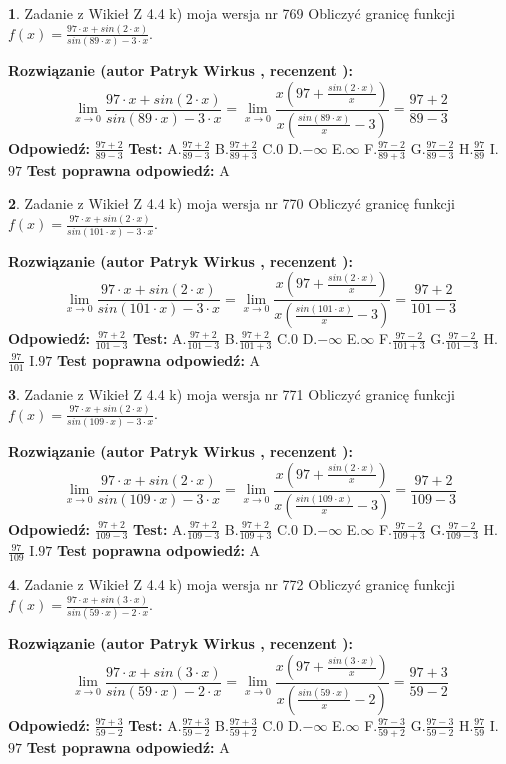 \documentclass[12pt, a4paper]{article}
\theoremstyle{definition} %
\newtheorem{zad}{}
\newcommand{\zadStart}[1]{\begin{zad}#1\newline}
\newcommand{\zadStop}{\end{zad}}
\newcommand{\rozwStart}[2]{\noindent \textbf{Rozwiązanie (autor #1 , recenzent #2): }\newline}
\newcommand{\rozwStop}{\newline}
\newcommand{\odpStart}{\noindent \textbf{Odpowiedź:}\newline}
\newcommand{\odpStop}{\newline}
\newcommand{\testStart}{\noindent \textbf{Test:}\newline}
\newcommand{\testStop}{\newline}
\newcommand{\kluczStart}{\noindent \textbf{Test poprawna odpowiedź:}\newline}
\newcommand{\kluczStop}{\newline}
\begin{document}
\zadStart{Zadanie z Wikieł Z 4.4 k) moja wersja nr 769}
Obliczyć granicę funkcji $f(x)=\frac{97\cdot x +sin(2\cdot x)}{sin(89\cdot x) -3\cdot x}$.
\zadStop
\rozwStart{Patryk Wirkus}{}
$$\lim\limits_{x\to 0}\frac{97\cdot x +sin(2\cdot x)}{sin(89\cdot x) -3\cdot x}
=\lim\limits_{x\to 0}\frac{x(97+\frac{sin(2\cdot x)}{x})}{x(\frac{sin(89\cdot x)}{x}-3)}
=\frac{97+2}{89-3}$$
\rozwStop
\odpStart
$\frac{97+2}{89-3}$
\odpStop
\testStart
A.$\frac{97+2}{89-3}$
B.$\frac{97+2}{89+3}$
C.$0$
D.$-\infty$
E.$\infty$
F.$\frac{97-2}{89+3}$
G.$\frac{97-2}{89-3}$
H.$\frac{97}{89}$
I.$97$
\testStop
\kluczStart
A
\kluczStop



\zadStart{Zadanie z Wikieł Z 4.4 k) moja wersja nr 770}
Obliczyć granicę funkcji $f(x)=\frac{97\cdot x +sin(2\cdot x)}{sin(101\cdot x) -3\cdot x}$.
\zadStop
\rozwStart{Patryk Wirkus}{}
$$\lim\limits_{x\to 0}\frac{97\cdot x +sin(2\cdot x)}{sin(101\cdot x) -3\cdot x}
=\lim\limits_{x\to 0}\frac{x(97+\frac{sin(2\cdot x)}{x})}{x(\frac{sin(101\cdot x)}{x}-3)}
=\frac{97+2}{101-3}$$
\rozwStop
\odpStart
$\frac{97+2}{101-3}$
\odpStop
\testStart
A.$\frac{97+2}{101-3}$
B.$\frac{97+2}{101+3}$
C.$0$
D.$-\infty$
E.$\infty$
F.$\frac{97-2}{101+3}$
G.$\frac{97-2}{101-3}$
H.$\frac{97}{101}$
I.$97$
\testStop
\kluczStart
A
\kluczStop



\zadStart{Zadanie z Wikieł Z 4.4 k) moja wersja nr 771}
Obliczyć granicę funkcji $f(x)=\frac{97\cdot x +sin(2\cdot x)}{sin(109\cdot x) -3\cdot x}$.
\zadStop
\rozwStart{Patryk Wirkus}{}
$$\lim\limits_{x\to 0}\frac{97\cdot x +sin(2\cdot x)}{sin(109\cdot x) -3\cdot x}
=\lim\limits_{x\to 0}\frac{x(97+\frac{sin(2\cdot x)}{x})}{x(\frac{sin(109\cdot x)}{x}-3)}
=\frac{97+2}{109-3}$$
\rozwStop
\odpStart
$\frac{97+2}{109-3}$
\odpStop
\testStart
A.$\frac{97+2}{109-3}$
B.$\frac{97+2}{109+3}$
C.$0$
D.$-\infty$
E.$\infty$
F.$\frac{97-2}{109+3}$
G.$\frac{97-2}{109-3}$
H.$\frac{97}{109}$
I.$97$
\testStop
\kluczStart
A
\kluczStop



\zadStart{Zadanie z Wikieł Z 4.4 k) moja wersja nr 772}
Obliczyć granicę funkcji $f(x)=\frac{97\cdot x +sin(3\cdot x)}{sin(59\cdot x) -2\cdot x}$.
\zadStop
\rozwStart{Patryk Wirkus}{}
$$\lim\limits_{x\to 0}\frac{97\cdot x +sin(3\cdot x)}{sin(59\cdot x) -2\cdot x}
=\lim\limits_{x\to 0}\frac{x(97+\frac{sin(3\cdot x)}{x})}{x(\frac{sin(59\cdot x)}{x}-2)}
=\frac{97+3}{59-2}$$
\rozwStop
\odpStart
$\frac{97+3}{59-2}$
\odpStop
\testStart
A.$\frac{97+3}{59-2}$
B.$\frac{97+3}{59+2}$
C.$0$
D.$-\infty$
E.$\infty$
F.$\frac{97-3}{59+2}$
G.$\frac{97-3}{59-2}$
H.$\frac{97}{59}$
I.$97$
\testStop
\kluczStart
A
\kluczStop
\end{document}
